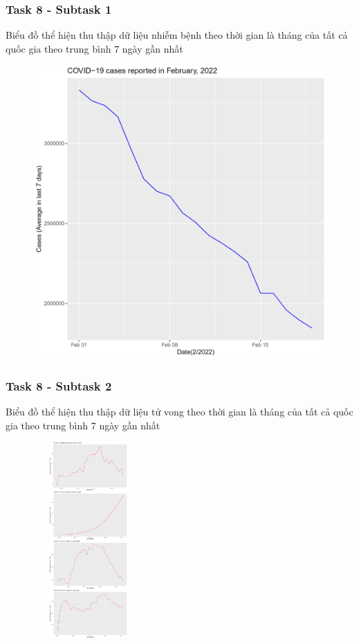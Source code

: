 \documentclass[english,10pt,table]{beamer}
\begin{document}
{
    \frametitle{Task 8 - Subtask 1}
    \begin{block}{Biểu đồ thể hiện thu thập dữ liệu nhiễm bệnh theo thời gian là tháng của tất cả quốc gia theo trung bình 7 ngày gần nhất}
    \begin{figure}[H]
			\centering
			\includegraphics[scale=0.1]{images/8.1.3.png}
	\end{figure}
    \end{block}
}
\frame
{
    \frametitle{Task 8 - Subtask 2}
    \begin{block}{Biểu đồ thể hiện thu thập dữ liệu tử vong theo thời gian là tháng của tất cả quốc gia theo trung bình 7 ngày gần nhất}
    \begin{figure}[H]
			\centering
			\includegraphics[height=7.5cm,width=4.2cm]{images/8.2.1.png}
	\end{figure}
    \end{block}
}
\end{document}
